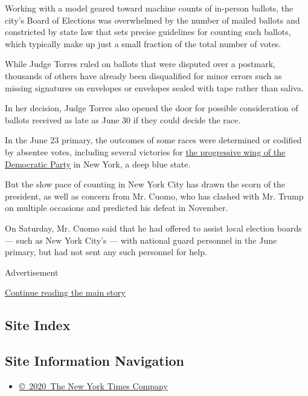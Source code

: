 Working with a model geared toward machine counts of in-person ballots,
the city's Board of Elections was overwhelmed by the number of mailed
ballots and constricted by state law that sets precise guidelines for
counting such ballots, which typically make up just a small fraction of
the total number of votes.

While Judge Torres ruled on ballots that were disputed over a postmark,
thousands of others have already been disqualified for minor errors such
as missing signatures on envelopes or envelopes sealed with tape rather
than saliva.

In her decision, Judge Torres also opened the door for possible
consideration of ballots received as late as June 30 if they could
decide the race.

In the June 23 primary, the outcomes of some races were determined or
codified by absentee votes, including several victories for
\href{https://www.nytimes.com/2020/07/24/nyregion/progressive-primaries-ny-legislature.html?searchResultPosition=1}{the
progressive wing of the Democratic Party} in New York, a deep blue
state.

But the slow pace of counting in New York City has drawn the scorn of
the president, as well as concern from Mr. Cuomo, who has clashed with
Mr. Trump on multiple occasions and predicted his defeat in November.

On Saturday, Mr. Cuomo said that he had offered to assist local election
boards --- such as New York City's --- with national guard personnel in
the June primary, but had not sent any such personnel for help.

Advertisement

\protect\hyperlink{after-bottom}{Continue reading the main story}

\hypertarget{site-index}{%
\subsection{Site Index}\label{site-index}}

\hypertarget{site-information-navigation}{%
\subsection{Site Information
Navigation}\label{site-information-navigation}}

\begin{itemize}
\tightlist
\item
  \href{https://help.nytimes.com/hc/en-us/articles/115014792127-Copyright-notice}{©~2020~The
  New York Times Company}
\end{itemize}

